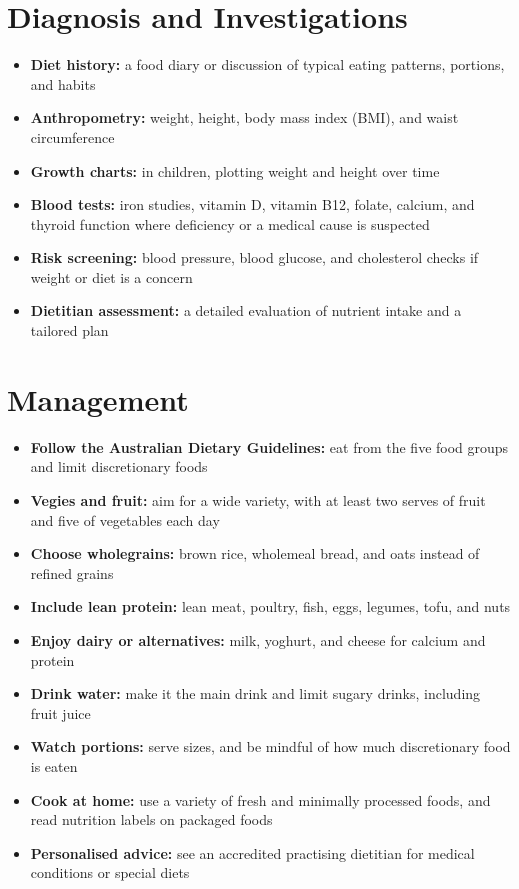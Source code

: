 \section*{Diagnosis and Investigations}
\begin{itemize}
    \item \textbf{Diet history:} a food diary or discussion of typical eating patterns, portions, and habits
    \item \textbf{Anthropometry:} weight, height, body mass index (BMI), and waist circumference
    \item \textbf{Growth charts:} in children, plotting weight and height over time
    \item \textbf{Blood tests:} iron studies, vitamin D, vitamin B12, folate, calcium, and thyroid function where deficiency or a medical cause is suspected
    \item \textbf{Risk screening:} blood pressure, blood glucose, and cholesterol checks if weight or diet is a concern
    \item \textbf{Dietitian assessment:} a detailed evaluation of nutrient intake and a tailored plan
\end{itemize}

\section*{Management}
\begin{itemize}
    \item \textbf{Follow the Australian Dietary Guidelines:} eat from the five food groups and limit discretionary foods
    \item \textbf{Vegies and fruit:} aim for a wide variety, with at least two serves of fruit and five of vegetables each day
    \item \textbf{Choose wholegrains:} brown rice, wholemeal bread, and oats instead of refined grains
    \item \textbf{Include lean protein:} lean meat, poultry, fish, eggs, legumes, tofu, and nuts
    \item \textbf{Enjoy dairy or alternatives:} milk, yoghurt, and cheese for calcium and protein
    \item \textbf{Drink water:} make it the main drink and limit sugary drinks, including fruit juice
    \item \textbf{Watch portions:} serve sizes, and be mindful of how much discretionary food is eaten
    \item \textbf{Cook at home:} use a variety of fresh and minimally processed foods, and read nutrition labels on packaged foods
    \item \textbf{Personalised advice:} see an accredited practising dietitian for medical conditions or special diets
\end{itemize}

